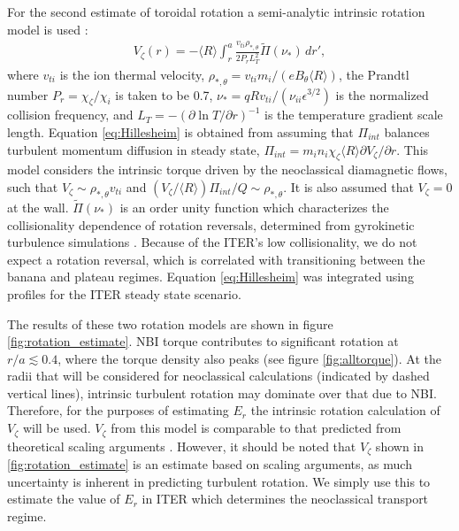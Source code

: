 \documentclass{article}
\numberwithin{figure}{section}
\numberwithin{equation}{section}
\begin{document}
For the second estimate of toroidal rotation a semi-analytic intrinsic rotation model is used \cite{Hillesheim2015}:
\begin{gather}
V_{\zeta}(r) = - \langle R \rangle \int_{r}^a \frac{v_{ti} \rho_{*,\theta}} {2 P_r L_T^2} \widetilde{\Pi} (\nu_*) \, d r',
\label{eq:Hillesheim}
\end{gather} 
where $v_{ti}$ is the ion thermal velocity, $\rho_{*,\theta} = v_{ti} m_i/(e B_{\theta} \langle R \rangle) $, the Prandtl number $P_r = \chi_{\zeta}/\chi_i$ is taken to be 0.7, $\nu_* = q R v_{ti}/(\nu_{ii} \epsilon^{3/2})$ is the normalized collision frequency, and $L_T = - \left( \partial \ln T/ \partial r \right)^{-1}$ is the temperature gradient scale length. Equation \ref{eq:Hillesheim} is obtained from assuming that $\Pi_{int}$ balances turbulent momentum diffusion in steady state, $\Pi_{int} = m_i n_i \chi_{\zeta} \langle R \rangle \partial V_{\zeta}/\partial r$. This model considers the intrinsic torque driven by the neoclassical diamagnetic flows, such that $V_{\zeta} \sim \rho_{*,\theta} v_{ti}$ and $(V_{\zeta}/\langle R \rangle) \Pi_{int}/Q \sim \rho_{*, \theta}$. It is also assumed that $V_{\zeta} = 0$ at the wall. %
$\widetilde{\Pi} (\nu_*)$ is an order unity function which characterizes the collisionality dependence of rotation reversals, determined from gyrokinetic turbulence simulations \cite{Barnes2013}. Because of the ITER's low collisionality, we do not expect a rotation reversal, which is correlated with transitioning between the banana and plateau regimes. Equation \ref{eq:Hillesheim} was integrated using profiles for the ITER steady state scenario. 

The results of these two rotation models are shown in figure \ref{fig:rotation_estimate}. NBI torque contributes to significant rotation at $r/a \lesssim 0.4$, where the torque density also peaks (see figure \ref{fig:alltorque}).  At the radii that will be considered for neoclassical calculations (indicated by dashed vertical lines), intrinsic turbulent rotation may dominate over that due to NBI. Therefore, for the purposes of estimating $E_r$ the intrinsic rotation calculation of $V_{\zeta}$ will be used. $V_{\zeta}$ from this model is comparable to that predicted from theoretical scaling arguments \cite{Parra2012}. However, it should be noted that $V_{\zeta}$ shown in \ref{fig:rotation_estimate} is an estimate based on scaling arguments, as much uncertainty is inherent in predicting turbulent rotation. We simply use this to estimate the value of $E_r$ in ITER which determines the neoclassical transport regime. 
\end{document}
